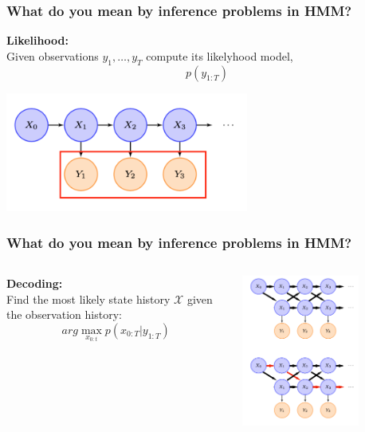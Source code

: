 \documentclass[xcolor=dvipsnames, compress]{beamer}
\begin{document}
\begin{frame}
\frametitle{What do you mean by inference problems in HMM?}
 \textbf{Likelihood:}\\ Given observations $y_1, \ldots, y_T$ compute its likelyhood model,  $$p(y_{1:T})$$
\begin{center}
	\includegraphics[width=0.6\textwidth]{images/m_likelihood.png}
\end{center}
\end{frame}

\begin{frame}
\frametitle{What do you mean by inference problems in HMM?}

\begin{columns}
	\begin{column}{0.5\textwidth}  %
	\textbf{Decoding:}\\ Find the most likely state history $\mathcal{X}$ given the observation history: $$arg \max_{x_{0:t}} p(x_{0:T} | y_{1:T})$$		
	\end{column}
	\begin{column}{0.5\textwidth}
	\begin{center}
		\includegraphics[width=0.7\textwidth]{images/m_decoding.png}
	\end{center}
	
\end{column}
\end{columns}
\end{frame}
\end{document}
